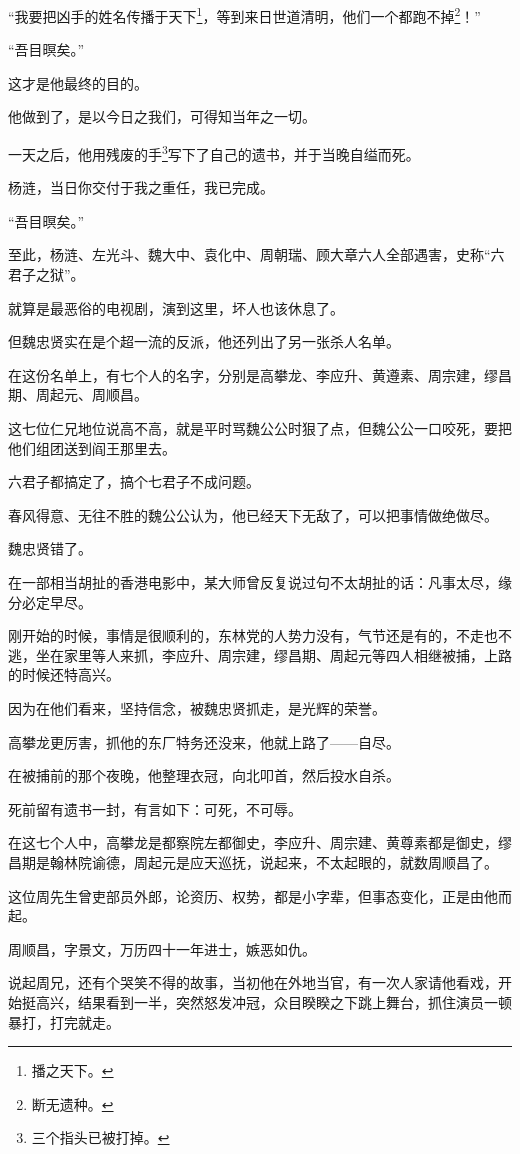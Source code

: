 \begin{multicols}{\theparacolNo}
		“我要把凶手的姓名传播于天下\footnote{播之天下。}，等到来日世道清明，他们一个都跑不掉\footnote{断无遗种。}！”

		“吾目暝矣。”

		这才是他最终的目的。

		他做到了，是以今日之我们，可得知当年之一切。

		一天之后，他用残废的手\footnote{三个指头已被打掉。}写下了自己的遗书，并于当晚自缢而死。

		杨涟，当日你交付于我之重任，我已完成。

		“吾目暝矣。”

		至此，杨涟、左光斗、魏大中、袁化中、周朝瑞、顾大章六人全部遇害，史称“六君子之狱”。

		就算是最恶俗的电视剧，演到这里，坏人也该休息了。

		但魏忠贤实在是个超一流的反派，他还列出了另一张杀人名单。

		在这份名单上，有七个人的名字，分别是高攀龙、李应升、黄遵素、周宗建，缪昌期、周起元、周顺昌。

		这七位仁兄地位说高不高，就是平时骂魏公公时狠了点，但魏公公一口咬死，要把他们组团送到阎王那里去。

		六君子都搞定了，搞个七君子不成问题。

		春风得意、无往不胜的魏公公认为，他已经天下无敌了，可以把事情做绝做尽。

		魏忠贤错了。

		在一部相当胡扯的香港电影中，某大师曾反复说过句不太胡扯的话：凡事太尽，缘分必定早尽。

		刚开始的时候，事情是很顺利的，东林党的人势力没有，气节还是有的，不走也不逃，坐在家里等人来抓，李应升、周宗建，缪昌期、周起元等四人相继被捕，上路的时候还特高兴。

		因为在他们看来，坚持信念，被魏忠贤抓走，是光辉的荣誉。

		高攀龙更厉害，抓他的东厂特务还没来，他就上路了——自尽。

		在被捕前的那个夜晚，他整理衣冠，向北叩首，然后投水自杀。

		死前留有遗书一封，有言如下：可死，不可辱。

		在这七个人中，高攀龙是都察院左都御史，李应升、周宗建、黄尊素都是御史，缪昌期是翰林院谕德，周起元是应天巡抚，说起来，不太起眼的，就数周顺昌了。

		这位周先生曾吏部员外郎，论资历、权势，都是小字辈，但事态变化，正是由他而起。

		周顺昌，字景文，万历四十一年进士，嫉恶如仇。

		说起周兄，还有个哭笑不得的故事，当初他在外地当官，有一次人家请他看戏，开始挺高兴，结果看到一半，突然怒发冲冠，众目睽睽之下跳上舞台，抓住演员一顿暴打，打完就走。


\end{multicols}
